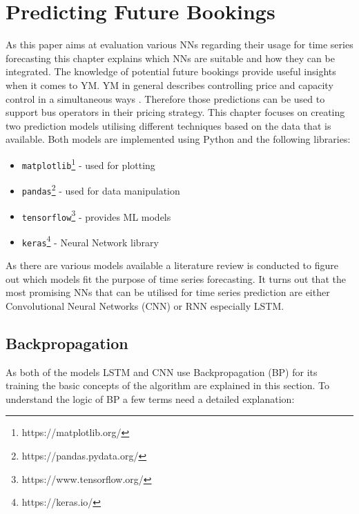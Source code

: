 %
%
% 
% 
% 

\chapter{Predicting Future Bookings}
\label{chap:predict}
As this paper aims at evaluation various NNs regarding their usage for time series forecasting this chapter explains which NNs are suitable and how they can be integrated. The knowledge of potential future bookings provide useful insights when it comes to YM. YM in general describes controlling price and capacity control in a simultaneous ways \cite{yield_m}. Therefore those predictions can be used to support bus operators in their pricing strategy. This chapter focuses on creating two prediction models utilising different techniques based on the data that is available. 
Both models are implemented using Python and the following libraries:
\begin{itemize}
\item  \verb|matplotlib|\footnote{https://matplotlib.org/} - used for plotting
\item \verb|pandas|\footnote{https://pandas.pydata.org/} - used for data manipulation 
\item \verb|tensorflow|\footnote{https://www.tensorflow.org/} - provides ML models
\item \verb|keras|\footnote{https://keras.io/} - Neural Network library
\end{itemize}

As there are various models available a literature review is conducted to figure out which models fit the purpose of time series forecasting. It turns out that the most promising NNs that can be utilised for time series prediction are either Convolutional Neural Networks (CNN) or RNN especially LSTM\cite{nn_1}\cite{nn_2}\cite{lstm_1}\cite{lstm_2}\cite{rnn_time_series_predict}.

\section{Backpropagation}
\label{sec:bp}

As both of the models LSTM and CNN use Backpropagation (BP) for its training the basic concepts of the algorithm are explained in this section. To understand the logic of BP a few terms need a detailed explanation: 
